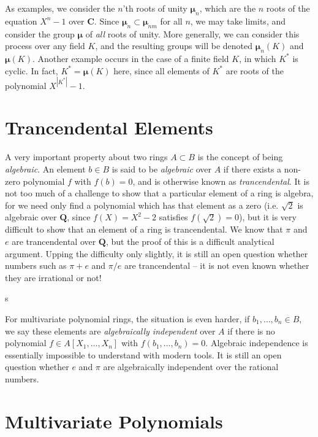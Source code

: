As examples, we consider the $n$'th roots of unity $\mathbf{\mu}_n$, which are the $n$ roots of the equation $X^n - 1$ over $\mathbf{C}$. Since $\mathbf{\mu}_n \subset \mathbf{\mu}_{nm}$ for all $n$, we may take limits, and consider the group $\mathbf{\mu}$ of {\it all} roots of unity. More generally, we can consider this process over any field $K$, and the resulting groups will be denoted $\mathbf{\mu}_n(K)$ and $\mathbf{\mu}(K)$. Another example occurs in the case of a finite field $K$, in which $K^*$ is cyclic. In fact, $K^* = \mathbf{\mu}(K)$ here, since all elements of $K^*$ are roots of the polynomial $X^{|K^*|} - 1$.

\section{Trancendental Elements}

A very important property about two rings $A \subset B$ is the concept of being {\it algebraic}. An element $b \in B$ is said to be {\it algebraic} over $A$ if there exists a non-zero polynomial $f$ with $f(b) = 0$, and is otherwise known as {\it trancendental}. It is not too much of a challenge to show that a particular element of a ring is algebra, for we need only find a polynomial which has that element as a zero (i.e. $\sqrt{2}$ is algebraic over $\mathbf{Q}$, since $f(X) = X^2 - 2$ satisfies $f(\sqrt{2}) = 0$), but it is very difficult to show that an element of a ring is trancendental. We know that $\pi$ and $e$ are trancendental over $\mathbf{Q}$, but the proof of this is a difficult analytical argument. Upping the difficulty only slightly, it is still an open question whether numbers such as $\pi + e$ and $\pi/e$ are trancendental -- it is not even known whether they are irrational or not!

s

For multivariate polynomial rings, the situation is even harder, if $b_1, \dots, b_n \in B$, we say these elements are {\it algebraically independent} over $A$ if there is no polynomial $f \in A[X_1, \dots, X_n]$ with $f(b_1, \dots, b_n) = 0$. Algebraic independence is essentially impossible to understand with modern tools. It is still an open question whether $e$ and $\pi$ are algebraically independent over the rational numbers.

\section{Multivariate Polynomials}

